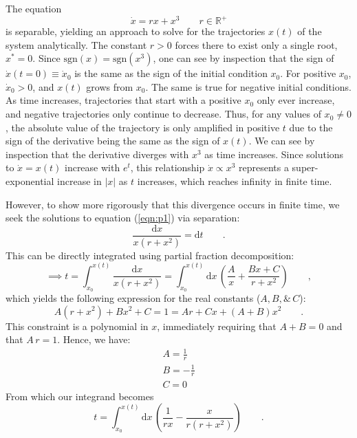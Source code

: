 \documentclass[draft]{agujournal2019}
\begin{document}
The equation 
\begin{equation}
    \label{eqn:p1}
    \dot x = rx + x^3 \qquad r\in\mathbb{R}^+
\end{equation}
is separable, yielding an approach to solve for the trajectories $x(t)$ of the system analytically. The constant $r>0$ forces there to exist only a single root, $x^*=0$. Since $\mathrm{sgn}(x) = \mathrm{sgn}(x^3)$, one can see by inspection that the sign of $\dot x(t=0)\equiv\dot x_0$ is the same as the sign of the initial condition $x_0$. For positive $x_0$, $\dot x_0 >0$, and $x(t)$ grows from $x_0$. The same is true for negative initial conditions. As time increases, trajectories that start with a positive $x_0$ only ever increase, and negative trajectories only continue to decrease. Thus, for any values of $x_0\neq0$, the absolute value of the trajectory is only amplified in positive $t$ due to the sign of the derivative being the same as the sign of $x(t)$. We can see by inspection that the derivative diverges with $x^3$ as time increases. Since solutions to $\dot x = x(t)$ increase with $e^t$, this relationship $\dot x \propto x^3$ represents a super-exponential increase in $|x|$ as $t$ increases, which reaches infinity in finite time.
\par
However, to show more rigorously that this divergence occurs in finite time, we seek the solutions to equation (\ref{eqn:p1}) via separation:
\begin{equation*}
    \frac{\mathrm{d}x}{x(r+x^2)} = {\mathrm{d}t} \qquad .
\end{equation*}
This can be directly integrated using partial fraction decomposition: 
\begin{equation*}
    \implies t = \int_{x_0}^{x(t)} \frac{\mathrm{d}x}{x(r+x^2)} = \int_{x_0}^{x(t)} \mathrm{d}x \, \left(\frac{A}{x} + \frac{Bx+C}{r+x^2} \right) \qquad ,
\end{equation*}
which yields the following expression for the real constants ($A,B,\&\,C$):
\begin{equation*}
    A(r + x^2) + Bx^2 + C = 1 = Ar + Cx + (A+B)x^2 \qquad .
\end{equation*}
This constraint is a polynomial in $x$, immediately requiring that $A+B=0$ and that $A\,r=1$. Hence, we have:
\begin{align*}
    A = \frac{1}{r} \\
    B = - \frac{1}{r} \\ 
    C = 0
\end{align*}
From which our integrand becomes
\begin{equation*}
    t = \int_{x_0}^{x(t)} \mathrm{d}x \, \left(\frac{1}{rx} - \frac{x}{r(r+x^2)} \right) \qquad .
\end{equation*}
\end{document}
